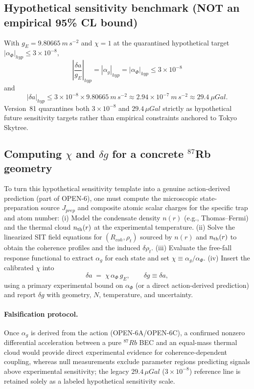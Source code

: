 \documentclass[american,11pt,letterpaper]{article}
\def\mathbf#1{#1}%
\def\mathrm#1{#1}%
\def\texttt#1{#1}%
\begin{document}
\subsection{Hypothetical sensitivity benchmark (NOT an empirical 95\% CL bound)}
With $g_E=9.80665~\mathrm{m\,s^{-2}}$ and $\chi=1$ at the quarantined hypothetical target $|\alpha_\Phi|_{\mathrm{hyp}} \le 3\times 10^{-8}$,
\[
\boxed{\;
\left|\frac{\delta a}{g_E}\right|_{\mathrm{hyp}}
= |\alpha_g|_{\mathrm{hyp}}
= |\alpha_\Phi|_{\mathrm{hyp}}
\le 3\times10^{-8}
\;}
\]
and
\[
\boxed{\;
|\delta a|_{\mathrm{hyp}}
\le 3\times10^{-8}\times 9.80665~\mathrm{m\,s^{-2}}
\approx 2.94\times10^{-7}~\mathrm{m\,s^{-2}}
\approx 29.4~\mu\mathrm{Gal}.
\;}
\]
Version~81 quarantines both $3\times 10^{-8}$ and $29.4\,\mu\mathrm{Gal}$ strictly as hypothetical future sensitivity targets rather than empirical constraints anchored to Tokyo Skytree.

\subsection{Computing $\chi$ and $\delta g$ for a concrete $^{87}$Rb geometry}
To turn this hypothetical sensitivity template into a genuine action-derived prediction (part of \texttt{OPEN-6}), one must compute the microscopic state-preparation source $J_{\mathrm{prep}}$ and composite atomic scalar charges for the specific trap and atom number:
(i) Model the condensate density $n(\mathbf{r})$ (e.g., Thomas--Fermi) and the thermal cloud $n_{\rm th}(\mathbf{r})$ at the experimental temperature.
(ii) Solve the linearized SIT field equations for $(R_{\mathrm{coh}},\rho_t)$ sourced by $n(\mathbf{r})$ and $n_{\rm th}(\mathbf{r})$ to obtain the coherence profiles and the induced $\delta\rho_t$.
(iii) Evaluate the free-fall response functional to extract $\alpha_g$ for each state and set $\chi \equiv \alpha_g/\alpha_\Phi$.
(iv) Insert the calibrated $\chi$ into
\[
\delta a \;=\; \chi\,\alpha_\Phi\,g_E,\qquad
\delta g \equiv \delta a,
\]
using a primary experimental bound on $\alpha_\Phi$ (or a direct action-derived prediction) and report $\delta g$ with geometry, $N$, temperature, and uncertainty.

\paragraph{Falsification protocol.}
Once $\alpha_g$ is derived from the action (\texttt{OPEN-6A}/\texttt{OPEN-6C}), a confirmed nonzero differential acceleration between a pure $^{87}\mathrm{Rb}$ BEC and an equal-mass thermal cloud would provide direct experimental evidence for coherence-dependent coupling, whereas null measurements exclude parameter regions predicting signals above experimental sensitivity; the legacy $29.4\,\mu\mathrm{Gal}$ ($3\times 10^{-8}$) reference line is retained solely as a labeled hypothetical sensitivity scale.
\end{document}
